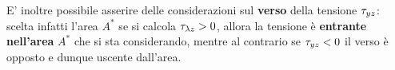 		
		E' inoltre possibile asserire delle considerazioni sul \textbf{verso} della tensione $\tau_{yz}$: scelta infatti l'area $A^*$ se si calcola $\tau_{\lambda z} > 0$, allora la tensione è \textbf{entrante nell'area} $A^*$ che si sta considerando, mentre al contrario se $\tau_{yz} < 0$ il verso è opposto e dunque uscente dall'area.
		
		
		
		
		
		
		
		
		
		
		
		
		
		
		
		
		